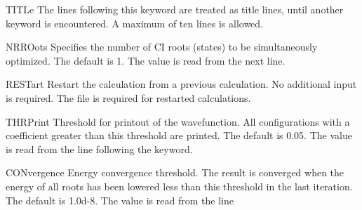  
\begin{keywordlist}
\item[TITLe]
The lines following this keyword are treated as title lines, until
another keyword is encountered. A maximum of ten lines is allowed.
\item[NRROots]
Specifies the number of CI roots (states) to be simultaneously
optimized. The default is 1. The value is read from the next line.
\item[RESTart]
Restart the calculation from a previous calculation. No additional
input is required. The  file is required for restarted
calculations.
\item[THRPrint]
Threshold for printout of the wavefunction. All configurations with a
coefficient greater than this threshold are printed.
The default is 0.05. The value is read from the line
following the keyword.
\item[CONvergence]
Energy convergence threshold. The result is converged when the energy
of all roots has been lowered less than this threshold in the last
iteration. The default is 1.0d-{}8. The value is read from the line

\end{keywordlist}
